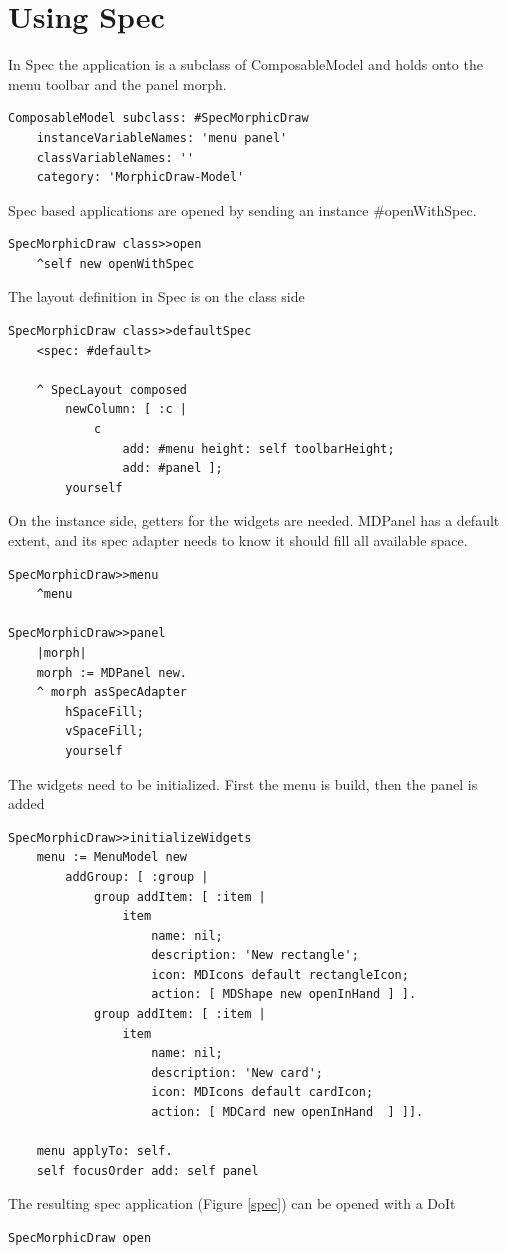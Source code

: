 \documentclass[10pt, twoside]{article}   	%
\begin{document}
\section{Using Spec}
In Spec the application is a subclass of ComposableModel and holds onto the menu toolbar
and the panel morph.
\begin{verbatim}
ComposableModel subclass: #SpecMorphicDraw
    instanceVariableNames: 'menu panel'
    classVariableNames: ''
    category: 'MorphicDraw-Model'
\end{verbatim}
Spec based applications are opened by sending an instance \#openWithSpec.
\begin{verbatim}
SpecMorphicDraw class>>open
	^self new openWithSpec
\end{verbatim}
The layout definition in Spec is on the class side
\begin{verbatim}
SpecMorphicDraw class>>defaultSpec
    <spec: #default>
	
    ^ SpecLayout composed
        newColumn: [ :c | 
            c 
                add: #menu height: self toolbarHeight;
                add: #panel ];
        yourself
\end{verbatim}
On the instance side, getters for the widgets are needed. MDPanel has a default extent,
and its spec adapter needs to know it should fill all available space.
\begin{verbatim}
SpecMorphicDraw>>menu
    ^menu
	
SpecMorphicDraw>>panel
    |morph|
    morph := MDPanel new.
    ^ morph asSpecAdapter
        hSpaceFill;
        vSpaceFill;
        yourself
\end{verbatim}
The widgets need to be initialized. First the menu is build, then the panel is added
\begin{verbatim}
SpecMorphicDraw>>initializeWidgets
    menu := MenuModel new
        addGroup: [ :group |
            group addItem: [ :item |
                item
                    name: nil;
                    description: 'New rectangle';
                    icon: MDIcons default rectangleIcon;
                    action: [ MDShape new openInHand ] ].
            group addItem: [ :item |
                item 
                    name: nil;
                    description: 'New card';
                    icon: MDIcons default cardIcon;
                    action: [ MDCard new openInHand  ] ]].
		
    menu applyTo: self.
    self focusOrder add: self panel
\end{verbatim} 
The resulting spec application (Figure \ref{spec}) can be opened with a DoIt
\begin{verbatim}
SpecMorphicDraw open
\end{verbatim}
\end{document}
